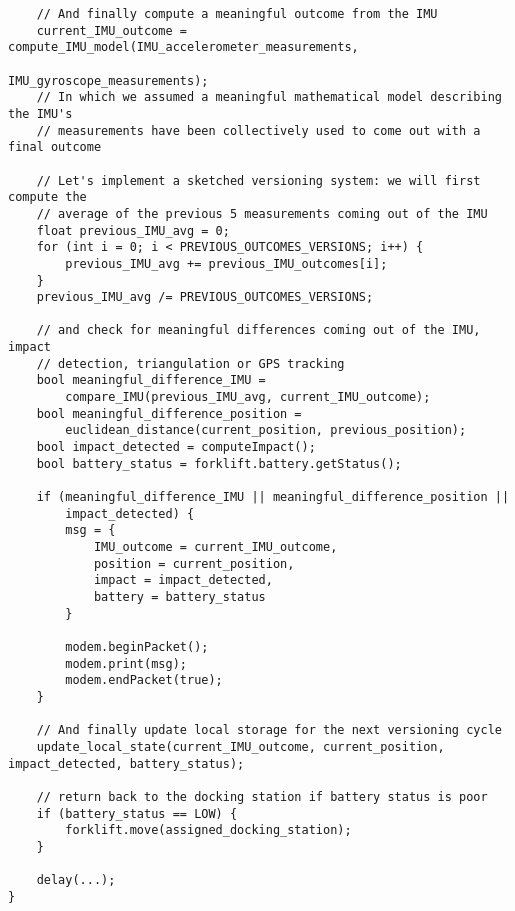 \documentclass[a4paper,11pt]{article} %
\begin{document}
\begin{verbatim}
    // And finally compute a meaningful outcome from the IMU
    current_IMU_outcome = compute_IMU_model(IMU_accelerometer_measurements,
                                            IMU_gyroscope_measurements);
    // In which we assumed a meaningful mathematical model describing the IMU's
    // measurements have been collectively used to come out with a final outcome

    // Let's implement a sketched versioning system: we will first compute the
    // average of the previous 5 measurements coming out of the IMU
    float previous_IMU_avg = 0;
    for (int i = 0; i < PREVIOUS_OUTCOMES_VERSIONS; i++) {
        previous_IMU_avg += previous_IMU_outcomes[i];
    }
    previous_IMU_avg /= PREVIOUS_OUTCOMES_VERSIONS;

    // and check for meaningful differences coming out of the IMU, impact
    // detection, triangulation or GPS tracking
    bool meaningful_difference_IMU =
        compare_IMU(previous_IMU_avg, current_IMU_outcome);
    bool meaningful_difference_position =
        euclidean_distance(current_position, previous_position);
    bool impact_detected = computeImpact();
    bool battery_status = forklift.battery.getStatus();

    if (meaningful_difference_IMU || meaningful_difference_position ||
        impact_detected) {
        msg = {
            IMU_outcome = current_IMU_outcome,
            position = current_position,
            impact = impact_detected,
            battery = battery_status
        }

        modem.beginPacket();
        modem.print(msg);
        modem.endPacket(true);
    }

    // And finally update local storage for the next versioning cycle
    update_local_state(current_IMU_outcome, current_position, impact_detected, battery_status);

    // return back to the docking station if battery status is poor
    if (battery_status == LOW) {
        forklift.move(assigned_docking_station);
    }

    delay(...);
}
\end{verbatim}
\end{document}
